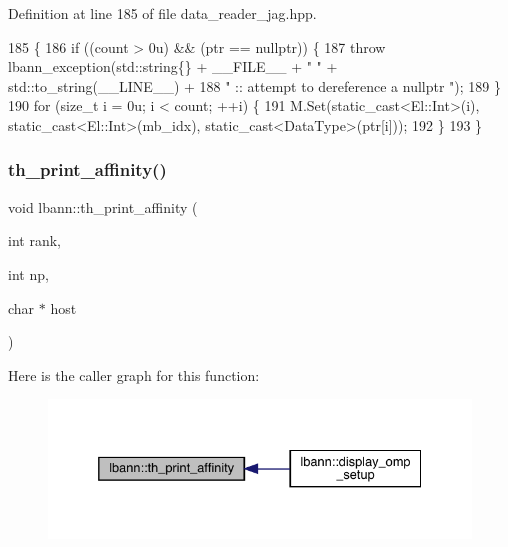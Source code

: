 Definition at line 185 of file data\+\_\+reader\+\_\+jag.\+hpp.


\begin{DoxyCode}
185                                                                                                  \{
186   \textcolor{keywordflow}{if} ((count > 0u) && (ptr == \textcolor{keyword}{nullptr})) \{
187     \textcolor{keywordflow}{throw} lbann\_exception(std::string\{\} + \_\_FILE\_\_ + \textcolor{stringliteral}{" "} + std::to\_string(\_\_LINE\_\_) +
188                           \textcolor{stringliteral}{" :: attempt to dereference a nullptr "});
189   \}
190   \textcolor{keywordflow}{for} (\textcolor{keywordtype}{size\_t} i = 0u; i < count; ++i) \{
191     M.Set(static\_cast<El::Int>(i), static\_cast<El::Int>(mb\_idx), static\_cast<DataType>(ptr[i]));
192   \}
193 \}
\end{DoxyCode}
\mbox{\label{namespacelbann_a31acedf53bb67180043939832c0220d3}} 
\subsubsection{\texorpdfstring{th\+\_\+print\+\_\+affinity()}{th\_print\_affinity()}}
{\footnotesize\ttfamily void lbann\+::th\+\_\+print\+\_\+affinity (\begin{DoxyParamCaption}\item[{int}]{rank,  }\item[{int}]{np,  }\item[{char $\ast$}]{host }\end{DoxyParamCaption})}

Here is the caller graph for this function\+:\nopagebreak
\begin{figure}[H]
\begin{center}
\leavevmode
\includegraphics[width=332pt]{namespacelbann_a31acedf53bb67180043939832c0220d3_icgraph}
\end{center}
\end{figure}
\mbox{\label{namespacelbann_a7336c565aa23c1dab784530c581db3d1}} 
